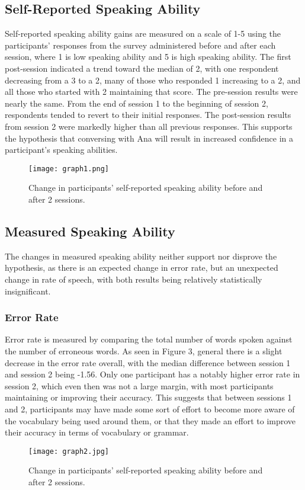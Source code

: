 \documentclass{vgtc}                          %
\begin{document}
\subsection{Self-Reported Speaking Ability}
Self-reported speaking ability gains are measured on a scale of 1-5 using the participants' responses from the survey administered before and after each session, where 1 is low speaking ability and 5 is high speaking ability.
The first post-session indicated a trend toward the median of 2, with one respondent decreasing from a 3 to a 2, many of those who responded 1 increasing to a 2, and all those who started with 2 maintaining that score.
The pre-session results were nearly the same.
From the end of session 1 to the beginning of session 2, respondents tended to revert to their initial responses.
The post-session results from session 2 were markedly higher than all previous responses.
This supports the hypothesis that conversing with Ana will result in increased confidence in a participant's speaking abilities.

\begin{figure}[htp]
    \centering
    \texttt{[image: graph1.png]}
    \caption{Change in participants' self-reported speaking ability before and after 2 sessions.}
    \label{fig:graph1}
\end{figure}

\subsection{Measured Speaking Ability}
The changes in measured speaking ability neither support nor disprove the hypothesis, as there is an expected change in error rate, but an unexpected change in rate of speech, with both results being relatively statistically insignificant.

\subsubsection{Error Rate}
Error rate is measured by comparing the total number of words spoken against the number of erroneous words.
As seen in Figure 3, general there is a slight decrease in the error rate overall, with the median difference between session 1 and session 2 being -1.56.
Only one participant has a notably higher error rate in session 2, which even then was not a large margin, with most participants maintaining or improving their accuracy.
This suggests that between sessions 1 and 2, participants may have made some sort of effort to become more aware of the vocabulary being used around them, or that they made an effort to improve their accuracy in terms of vocabulary or grammar.
\begin{figure}[htp]
    \centering
    \texttt{[image: graph2.jpg]}
    \caption{Change in participants' self-reported speaking ability before and after 2 sessions.}
    \label{fig:graph2}
\end{figure}
\end{document}
